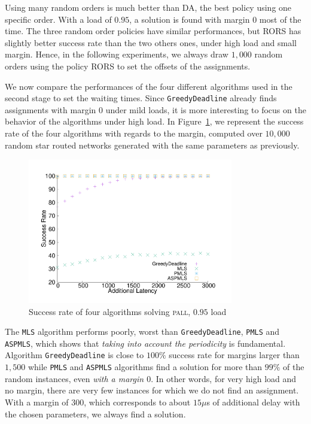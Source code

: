 \documentclass[a4paper,10pt]{journal}
\newcommand\greedydeadline{\texttt{GreedyDeadline}\xspace}
\newcommand\MLS{\texttt{MLS}\xspace}
\newcommand\PMLS{\texttt{PMLS}\xspace}
\newcommand\ASPMLS{\texttt{ASPMLS}\xspace}
\newcommand\pall{\textsc{pall}\xspace}
\begin{document}
     Using many random orders is much better than DA, the best policy using one specific order. 
     With a load of $0.95$, a solution is found with margin $0$ most of the time. The three random order policies have similar performances, but RORS has slightly better success rate than the two others ones, under high load and small margin. Hence, in the following experiments, we always draw $1,000$ random orders using the policy RORS to set the offsets of the assignments.
     
     We now compare the performances of the four different algorithms used in the second stage to set the waiting times. Since \greedydeadline already finds assignments with margin $0$ under mild loads, it is more interesting to focus on the behavior of the algorithms under high load. In Figure~\ref{fig:success21000}, we represent the success rate of the four algorithms with regards to the margin, computed over $10,000$ random star routed networks generated with the same parameters as previously. 
     
    \begin{figure} [h] 
       \begin{center}
      \includegraphics[width=0.8\textwidth]{retour_21000.pdf}
      \end{center}
      \caption{Success rate of four algorithms solving \pall, $0.95$ load}
     \label{fig:success21000}
     \end{figure}
     
      The \MLS algorithm performs poorly, worst than \greedydeadline, \PMLS and \ASPMLS, which shows that \emph{taking into account the periodicity} is fundamental.
     Algorithm \greedydeadline is close to $100\%$ success rate for margins larger than $1,500$ while  \PMLS and \ASPMLS algorithms find a solution for more than $99\%$ of the random instances, even \emph{with a margin $0$}. In other words, for very high load and no margin, there are very few instances for which we do not find an assignment. With a margin of $300$, which corresponds to about $15\mu$s of additional delay with the chosen parameters, we always find a solution. 
     
\end{document}
